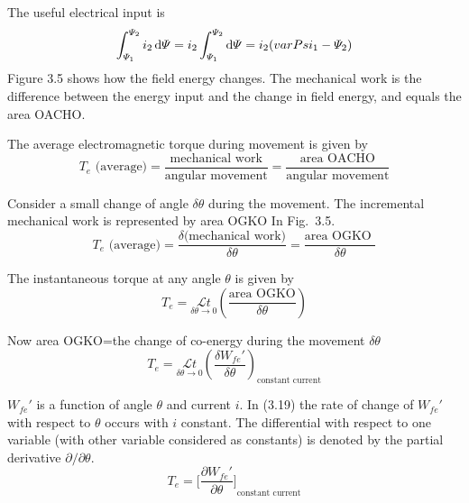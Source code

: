 \documentclass[a4paper,numbers=noenddot,12pt]{scrbook}
\begin{document}
The useful electrical input is 
\begin{equation}
    \int_{\varPsi_1}^{\varPsi_2} i_2 \dif \varPsi = i_2  \int_{\varPsi_1}^{\varPsi_2} \dif \varPsi =  i_2 (varPsi_1 -\varPsi_2)
    \label{eq:Eq3.15}
\end{equation}
Figure 3.5 shows how the field energy changes. The mechanical work is the difference between the energy input and the change in field energy, and equals the area OACHO.\@

The average electromagnetic torque during movement is given by 
\begin{equation}
    T_e \text{\ (average)} = \dfrac{\text{mechanical work}}{\text{angular movement}} = \dfrac{\text{area OACHO}}{\text{angular movement}}
    \label{eq:Eq3.16}
\end{equation}

Consider a small change of angle $\delta \theta$ during the movement. The incremental mechanical work is represented by area OGKO In Fig.\ 3.5.
\begin{equation}
    T_e \text{\ (average)}=\dfrac{\delta\text{(mechanical work)}}{\delta \theta} = \dfrac{\text{area OGKO }}{\delta\theta}
    \label{eq:Eq3.17}
\end{equation}

The instantaneous torque at any angle $\theta$ is given by
\begin{equation}
    T_e = \underset{\delta \theta \to 0}{\mathcal{L} t} \left(\dfrac{\text{area OGKO}}{\delta \theta}\right)
    \label{eq:Eq3.18}
\end{equation}

Now area OGKO=the change of co-energy during the movement $\delta \theta$
\begin{equation}
    T_e = \underset{\delta \theta \to 0}{\mathcal{L} t} {\left(\dfrac{\delta W_{fe}'}{\delta \theta}\right)}_{\text{constant current}}
    \label{eq:Eq3.19}
\end{equation}

$W_{fe}'$ is a function of angle $\theta$ and current $i$. In (3.19) the rate of change of $W_{fe}'$ with respect to $\theta$ occurs with $i$ constant. The differential with respect to one variable (with other variable considered as constants) is denoted by the partial derivative $\partial / \partial \theta$.
\begin{equation}
    T_e = {\Big[ \dfrac{\partial W_{fe}'}{\partial \theta}\Big]}_{\text{constant current}}
    \label{eq:Eq3.20}
\end{equation}
\end{document}
